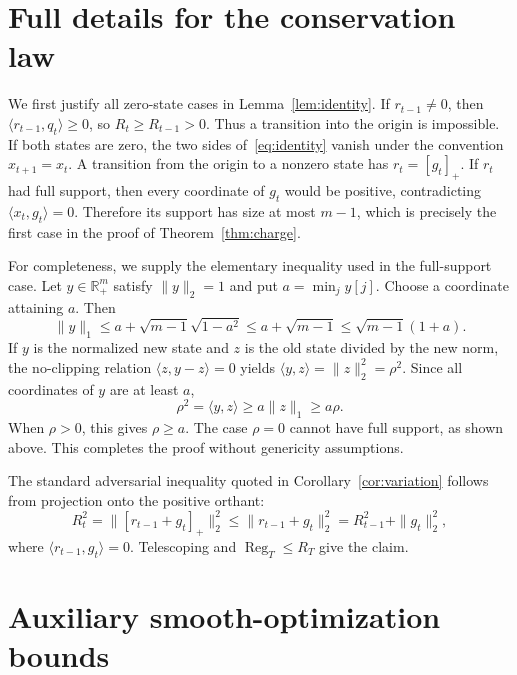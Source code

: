 \documentclass{article}
\newcommand{\Reg}{\operatorname{Reg}}
\newcommand{\pos}[1]{\left[#1\right]_+}
\begin{document}
\appendix

\section{Full details for the conservation law}
\label{app:identity}

We first justify all zero-state cases in Lemma~\ref{lem:identity}. If $r_{t-1}\ne0$, then $\langle r_{t-1},q_t\rangle\ge0$, so $R_t\ge R_{t-1}>0$. Thus a transition into the origin is impossible. If both states are zero, the two sides of~\eqref{eq:identity} vanish under the convention $x_{t+1}=x_t$. A transition from the origin to a nonzero state has $r_t=\pos{g_t}$. If $r_t$ had full support, then every coordinate of $g_t$ would be positive, contradicting $\langle x_t,g_t\rangle=0$. Therefore its support has size at most $m-1$, which is precisely the first case in the proof of Theorem~\ref{thm:charge}.

For completeness, we supply the elementary inequality used in the full-support case. Let $y\in\mathbb R_+^m$ satisfy $\|y\|_2=1$ and put $a=\min_jy[j]$. Choose a coordinate attaining $a$. Then
\begin{equation}
\|y\|_1
\le a+\sqrt{m-1}\sqrt{1-a^2}
\le a+\sqrt{m-1}
\le\sqrt{m-1}(1+a).
\end{equation}
If $y$ is the normalized new state and $z$ is the old state divided by the new norm, the no-clipping relation $\langle z,y-z\rangle=0$ yields $\langle y,z\rangle=\|z\|_2^2=\rho^2$. Since all coordinates of $y$ are at least $a$,
\begin{equation}
\rho^2=\langle y,z\rangle\ge a\|z\|_1\ge a\rho.
\end{equation}
When $\rho>0$, this gives $\rho\ge a$. The case $\rho=0$ cannot have full support, as shown above. This completes the proof without genericity assumptions.

The standard adversarial inequality quoted in Corollary~\ref{cor:variation} follows from projection onto the positive orthant:
\begin{equation}
R_t^2=\|\pos{r_{t-1}+g_t}\|_2^2
\le\|r_{t-1}+g_t\|_2^2
=R_{t-1}^2+\|g_t\|_2^2,
\end{equation}
where $\langle r_{t-1},g_t\rangle=0$. Telescoping and $\Reg_T\le R_T$ give the claim.

\section{Auxiliary smooth-optimization bounds}
\label{app:smooth}
\end{document}
